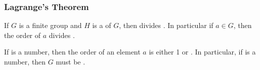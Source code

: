 \subsubsection{Lagrange's Theorem}\label{subsubsec:Lagranges_Theorem}
\begin{theorem}
  If $G$ is a finite group and $H$ is a  of $G$, then  divides .
  In particular if $a \in G$, then the order of $a$ divides .
\end{theorem}

\begin{remark*}
  If  is a  number, then the order of an element $a$ is either 1 or .
  In particular, if  is a  number, then $G$ must be .
\end{remark*}

